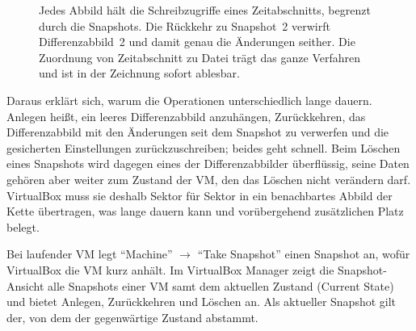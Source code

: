 \begin{figure}[H]
\centering
{}
\caption[Kette der Differenzabbilder nach zwei Snapshots]{Jedes Abbild hält die Schreibzugriffe eines Zeitabschnitts, begrenzt durch die Snapshots. Die Rückkehr zu Snapshot~2 verwirft Differenzabbild~2 und damit genau die Änderungen seither. Die Zuordnung von Zeitabschnitt zu Datei trägt das ganze Verfahren und ist in der Zeichnung sofort ablesbar.}
\label{abb:snapshotkette}
\end{figure}

Daraus erklärt sich, warum die Operationen unterschiedlich lange dauern. Anlegen heißt, ein leeres Differenzabbild anzuhängen, Zurückkehren, das Differenzabbild mit den Änderungen seit dem Snapshot zu verwerfen und die gesicherten Einstellungen zurückzuschreiben; beides geht schnell. Beim Löschen eines Snapshots wird dagegen eines der Differenzabbilder überflüssig, seine Daten gehören aber weiter zum Zustand der VM, den das Löschen nicht verändern darf. VirtualBox muss sie deshalb Sektor für Sektor in ein benachbartes Abbild der Kette übertragen, was lange dauern kann und vorübergehend zusätzlichen Platz belegt.

Bei laufender VM legt \enquote{Machine} $\rightarrow$ \enquote{Take Snapshot} einen Snapshot an, wofür VirtualBox die VM kurz anhält. Im VirtualBox Manager zeigt die Snapshot-Ansicht alle Snapshots einer VM samt dem aktuellen Zustand (Current State) und bietet Anlegen, Zurückkehren und Löschen an. Als aktueller Snapshot gilt der, von dem der gegenwärtige Zustand abstammt.

